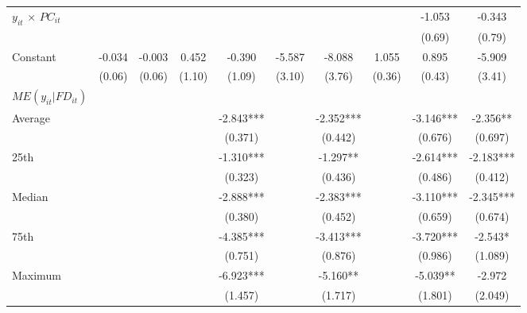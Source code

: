 \documentclass[12pt, a4paper]{article}
\begin{document}
\begin{table}[htbp]
\begin{threeparttable}
{\begin{tabular}{l*{9}{c}}
					$y_{it}$ $\times$ $PC_{it}$ &                     &                     &                     &                     &                     &                     &                     &      -1.053         &      -0.343         \\
					&                     &                     &                     &                     &                     &                     &                     &      (0.69)         &      (0.79)         \\
					Constant            &      -0.034         &      -0.003         &       0.452         &      -0.390         &      -5.587         &      -8.088\sym{*}  &       1.055\sym{**} &       0.895\sym{*}  &      -5.909         \\
					&      (0.06)         &      (0.06)         &      (1.10)         &      (1.09)         &      (3.10)         &      (3.76)         &      (0.36)         &      (0.43)         &      (3.41)         \\
					\hline
					$ME(y_{it}|FD_{it})$ \\
					Average&&&&	-2.843***	&&	-2.352***	&&	-3.146***	&	-2.356** \\
					&&&&(0.371)   &&		(0.442)   	&&	(0.676)   	&	(0.697)   \\
					
					25th &&&&	-1.310***&&		-1.297** &&		-2.614***	&	-2.183***\\
					&&&&(0.323)   &&		(0.436)   	&&	(0.486)   &		(0.412)   \\
					
					Median&&&&	-2.888***	&&	-2.383***	&&	-3.110***	&	-2.345***\\
					&&&&(0.380)   &&		(0.452)   	&&	(0.659)  & 		(0.674)   \\
					
					75th&&&&	-4.385***	&&	-3.413***	&&	-3.720***	&	-2.543* \\ 
					&&&&(0.751)   &&		(0.876)   &&		(0.986)   &		(1.089)   \\
					
					Maximum&&&&	-6.923***	&&	-5.160** 	&&	-5.039** &		-2.972 \\  
					&&&&(1.457)   &&		(1.717)   &&		(1.801)   	&	(2.049)\\   
					

\end{tabular}}
\end{threeparttable}
\end{table}
\end{document}
